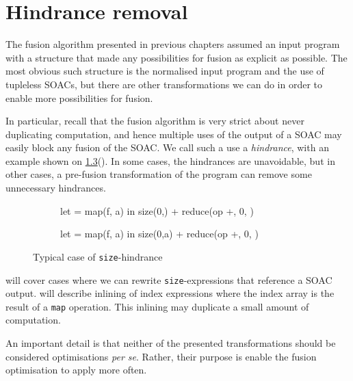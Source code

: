 \chapter{Hindrance removal}
\label{chap:hindrance-removal}

The fusion algorithm presented in previous chapters assumed an input
program with a structure that made any possibilities for fusion as
explicit as possible.  The most obvious such structure is the
normalised input program and the use of tupleless SOACs, but there are
other transformations we can do in order to enable more possibilities
for fusion.

In particular, recall that the fusion algorithm is very strict about
never duplicating computation, and hence multiple uses of the output
of a SOAC may easily block any fusion of the SOAC.  We call such a use
a \textit{hindrance}, with an example shown on
\cref{fig:size-hindrance}().  In
some cases, the hindrances are unavoidable, but in other cases, a
pre-fusion transformation of the program can remove some unnecessary
hindrances.

\begin{figure}
\begin{subfigure}[t]{.5\textwidth}
\begin{colorcode}
let  = map(f, a) in
size(0,) + reduce(op +, 0, )
\end{colorcode}
\label{fig:size-hindrance-blocking}
\end{subfigure}%
\begin{subfigure}[t]{.5\textwidth}
\begin{colorcode}
let  = map(f, a) in
size(0,a) + reduce(op +, 0, )
\end{colorcode}
\label{fig:size-hindrance-removed}
\end{subfigure}%
\caption{Typical case of \texttt{size}-hindrance}
\label{fig:size-hindrance}
\end{figure}

 will cover cases where we can
rewrite \texttt{size}-expressions that reference a SOAC output.
 will describe inlining of index
expressions where the index array is the result of a \texttt{map}
operation.  This inlining may duplicate a small amount of computation.

An important detail is that neither of the presented transformations
should be considered optimisations \textit{per se}.  Rather, their
purpose is enable the fusion optimisation to apply more often.

